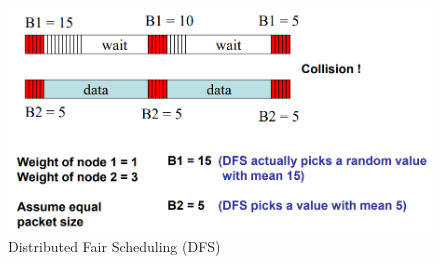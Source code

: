 \vspace*{0.4cm}
\begin{figure}[!h] 
    \centering 
    \includegraphics[scale = 0.35]{images/DFS.png} 
    \caption{Distributed Fair Scheduling (DFS)}
    \label{DFS}
\end{figure}